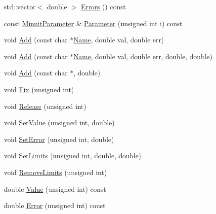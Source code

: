 \begin{DoxyCompactItemize}
\item 
std\+::vector$<$ double $>$ \mbox{\hyperlink{classROOT_1_1Minuit2_1_1MnApplication_a0883d421b0b5fa90d5a9a9192a78e9f5}{Errors}} () const
\item 
const \mbox{\hyperlink{classROOT_1_1Minuit2_1_1MinuitParameter}{Minuit\+Parameter}} \& \mbox{\hyperlink{classROOT_1_1Minuit2_1_1MnApplication_aeb67b1d0ce5b357886d8413c3b166ef2}{Parameter}} (unsigned int i) const
\item 
void \mbox{\hyperlink{classROOT_1_1Minuit2_1_1MnApplication_a2912c94b7cb69b29862e1e41ffbc4542}{Add}} (const char $\ast$\mbox{\hyperlink{classROOT_1_1Minuit2_1_1MnApplication_ad333315ce51772fef3094491b37f309d}{Name}}, double val, double err)
\item 
void \mbox{\hyperlink{classROOT_1_1Minuit2_1_1MnApplication_afd0879fb1f21d49dd649698c1cd25e50}{Add}} (const char $\ast$\mbox{\hyperlink{classROOT_1_1Minuit2_1_1MnApplication_ad333315ce51772fef3094491b37f309d}{Name}}, double val, double err, double, double)
\item 
void \mbox{\hyperlink{classROOT_1_1Minuit2_1_1MnApplication_a67220ef54f4862a27490162b2f7cf832}{Add}} (const char $\ast$, double)
\item 
void \mbox{\hyperlink{classROOT_1_1Minuit2_1_1MnApplication_a98bea1ca3fb2a311b1c0e72a58ec2d9f}{Fix}} (unsigned int)
\item 
void \mbox{\hyperlink{classROOT_1_1Minuit2_1_1MnApplication_ab690313ed666d5a794a13b05054f5575}{Release}} (unsigned int)
\item 
void \mbox{\hyperlink{classROOT_1_1Minuit2_1_1MnApplication_af6147ded182dfe93c2200d621050c642}{Set\+Value}} (unsigned int, double)
\item 
void \mbox{\hyperlink{classROOT_1_1Minuit2_1_1MnApplication_a04e02c59439b7c638cea29938030b2f8}{Set\+Error}} (unsigned int, double)
\item 
void \mbox{\hyperlink{classROOT_1_1Minuit2_1_1MnApplication_ad6c07174e01b117cb67a43211753ae06}{Set\+Limits}} (unsigned int, double, double)
\item 
void \mbox{\hyperlink{classROOT_1_1Minuit2_1_1MnApplication_a2c99043d2263ae51967867e1a26d4e30}{Remove\+Limits}} (unsigned int)
\item 
double \mbox{\hyperlink{classROOT_1_1Minuit2_1_1MnApplication_a408778c8cf19fe7bdf443a9d51389d66}{Value}} (unsigned int) const
\item 
double \mbox{\hyperlink{classROOT_1_1Minuit2_1_1MnApplication_aedc3775627672ba2038e8a26d6df13f1}{Error}} (unsigned int) const

\end{DoxyCompactItemize}
